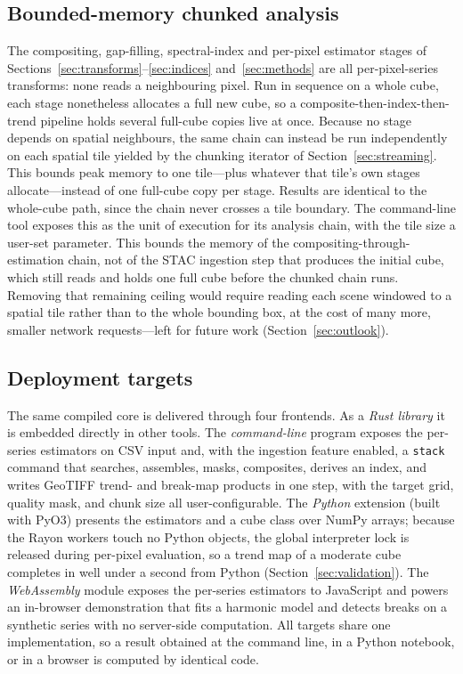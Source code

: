 \documentclass[review]{elsarticle}
\begin{document}
\subsection{Bounded-memory chunked analysis}
\label{sec:chunked}
The compositing, gap-filling, spectral-index and per-pixel estimator stages
of Sections~\ref{sec:transforms}--\ref{sec:indices} and~\ref{sec:methods} are
all per-pixel-series transforms: none reads a neighbouring pixel. Run in
sequence on a whole cube, each stage nonetheless allocates a full new cube,
so a composite-then-index-then-trend pipeline holds several full-cube copies
live at once. Because no stage depends on spatial neighbours, the same chain
can instead be run independently on each spatial tile yielded by the
chunking iterator of Section~\ref{sec:streaming}. This bounds peak
memory to one tile---plus whatever that tile's own stages allocate---instead
of one full-cube copy per stage. Results are identical to the whole-cube
path, since the chain never crosses a tile boundary. The command-line tool
exposes this as the unit of execution for its analysis chain, with the tile
size a user-set parameter. This bounds the memory of the
compositing-through-estimation chain, not of the STAC ingestion step that
produces the initial cube, which still reads and holds one full cube before
the chunked chain runs. Removing that remaining ceiling would require
reading each scene windowed to a spatial tile rather than to the whole
bounding box, at the cost of many more, smaller network requests---left for
future work (Section~\ref{sec:outlook}).

\subsection{Deployment targets}
\label{sec:targets}
The same compiled core is delivered through four frontends. As a \emph{Rust
library} it is embedded directly in other tools. The \emph{command-line}
program exposes the per-series estimators on CSV input and, with the ingestion
feature enabled, a \texttt{stack} command that searches, assembles, masks,
composites, derives an index, and writes GeoTIFF trend- and break-map products
in one step, with the target grid, quality mask, and chunk size all
user-configurable. The \emph{Python} extension
(built with PyO3) presents the estimators and a cube class over NumPy arrays;
because the Rayon workers touch no Python objects, the global interpreter lock is
released during per-pixel evaluation, so a trend map of a moderate cube completes
in well under a second from Python (Section~\ref{sec:validation}). The
\emph{WebAssembly} module exposes the per-series estimators to JavaScript and
powers an in-browser demonstration that fits a harmonic model and detects breaks
on a synthetic series with no server-side computation. All targets share one
implementation, so a result obtained at the command line, in a Python notebook,
or in a browser is computed by identical code.
\end{document}

